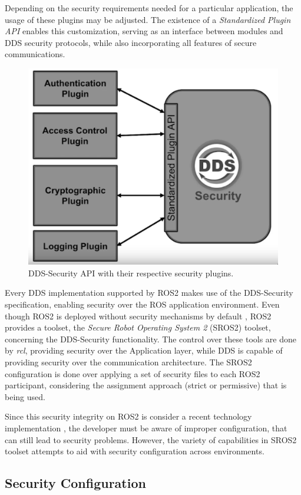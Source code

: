 Depending on the security requirements needed for a particular application, the usage of these plugins may be adjusted. The existence of a \textit{Standardized Plugin API} enables this customization, serving as an interface between modules and DDS security protocols, while also incorporating all features of secure communications. 

\begin{figure}[H]
    \centering
    \includegraphics[width=0.5\linewidth]{images/dds-security.png}
    \caption{DDS-Security API with their respective security plugins.}
    \label{fig:dds-security}
\end{figure}

Every DDS implementation supported by ROS2 makes use of the DDS-Security specification, enabling security over the ROS application environment. Even though ROS2 is deployed without security mechanisms by default \cite{ros-dds-integration}, ROS2 provides a toolset, the \textit{Secure Robot Operating System 2} (SROS2) toolset, concerning the DDS-Security functionality. The control over these tools are done by \textit{rcl}, providing security over the Application layer, while DDS is capable of providing security over the communication architecture. The SROS2 configuration is done over applying a set of security files to each ROS2 participant, considering the assignment approach (strict or permissive) that is being used.

Since this security integrity on ROS2 is consider a recent technology implementation \cite{ros-dds-integration}, the developer must be aware of improper configuration, that can still lead to security problems. However, the variety of capabilities in SROS2 toolset attempts to aid with security configuration across environments. 

\subsection{Security Configuration}


